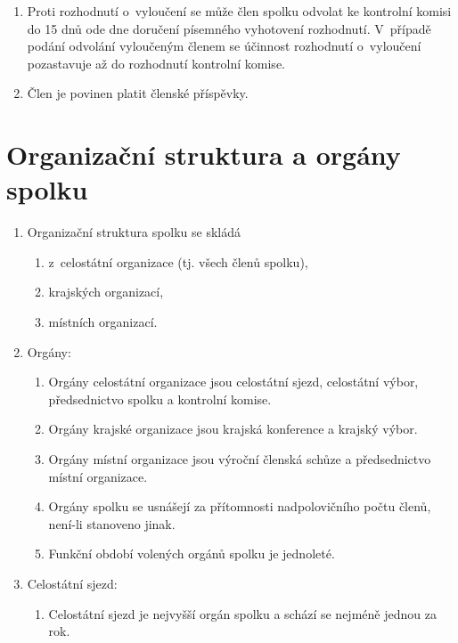 \documentclass[a4paper]{article}
\begin{document}
\begin{enumerate}
    \item Proti rozhodnutí o~vyloučení se může člen spolku odvolat ke
        kontrolní komisi do 15 dnů ode dne doručení písemného vyhotovení
        rozhodnutí. V~případě podání odvolání vyloučeným členem se účinnost
        rozhodnutí o~vyloučení pozastavuje až do rozhodnutí kontrolní komise.

    \item Člen je povinen platit členské příspěvky.
    \end{enumerate}



\section{Organizační struktura a orgány spolku}
    \begin{enumerate}
    \item Organizační struktura spolku se skládá
        \begin{enumerate}
        \item z~celostátní organizace (tj. všech členů spolku),
        \item krajských organizací,
        \item místních organizací.
        \end{enumerate}

    \item Orgány:
        \begin{enumerate}
        \item Orgány celostátní organizace jsou celostátní sjezd,
            celostátní výbor,
            předsednictvo spolku a kontrolní komise.
        \item Orgány krajské organizace jsou krajská konference a krajský
            výbor.
        \item Orgány místní organizace jsou výroční členská schůze a
            předsednictvo místní organizace.
        \item Orgány spolku se usnášejí za přítomnosti nadpolovičního počtu
            členů, není-li stanoveno jinak.
        \item Funkční období volených orgánů spolku je jednoleté.
        \end{enumerate}

    \item Celostátní sjezd:
        \begin{enumerate}
        \item Celostátní sjezd je nejvyšší orgán spolku a schází se nejméně
            jednou za rok.


\end{enumerate}
\end{enumerate}
\end{document}

